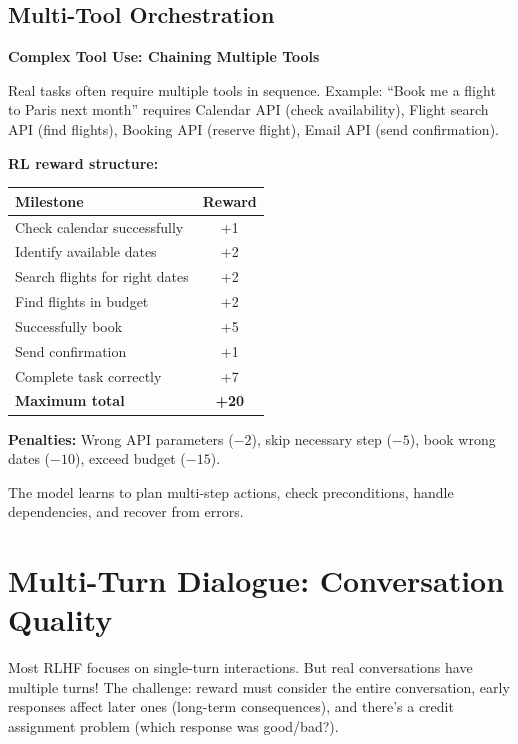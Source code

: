 \begin{chapterenv}
\subsection{Multi-Tool Orchestration}

\begin{infobox}
\textbf{Complex Tool Use: Chaining Multiple Tools}

Real tasks often require multiple tools in sequence. Example: ``Book me a flight to Paris next month'' requires Calendar API (check availability), Flight search API (find flights), Booking API (reserve flight), Email API (send confirmation).

\textbf{RL reward structure:}

\begin{center}
\begin{tabular}{lc}
\toprule
\textbf{Milestone} & \textbf{Reward} \\
\midrule
Check calendar successfully & +1 \\
Identify available dates & +2 \\
Search flights for right dates & +2 \\
Find flights in budget & +2 \\
Successfully book & +5 \\
Send confirmation & +1 \\
Complete task correctly & +7 \\
\midrule
\textbf{Maximum total} & \textbf{+20} \\
\bottomrule
\end{tabular}
\end{center}

\textbf{Penalties:} Wrong API parameters ($-2$), skip necessary step ($-5$), book wrong dates ($-10$), exceed budget ($-15$).

The model learns to plan multi-step actions, check preconditions, handle dependencies, and recover from errors.
\end{infobox}

\section{Multi-Turn Dialogue: Conversation Quality}

Most RLHF focuses on single-turn interactions. But real conversations have multiple turns! The challenge: reward must consider the entire conversation, early responses affect later ones (long-term consequences), and there's a credit assignment problem (which response was good/bad?).


\end{chapterenv}
